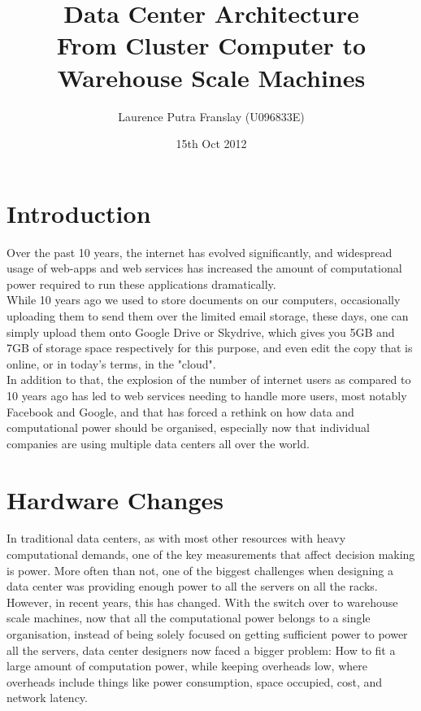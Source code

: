 \documentclass[]{article}
\begin{document}
\title{Data Center Architecture\\From Cluster Computer to Warehouse Scale Machines}
\author{Laurence Putra Franslay (U096833E)}
\date{15th Oct 2012}
\maketitle

\section{Introduction}
Over the past 10 years, the internet has evolved significantly, and widespread usage of web-apps and web services has increased the amount of computational power required to run these applications dramatically. \\

While 10 years ago we used to store documents on our computers, occasionally uploading them to send them over the limited email storage, these days, one can simply upload them onto Google Drive or Skydrive, which gives you 5GB and 7GB of storage space respectively for this purpose, and even edit the copy that is online, or in today's terms, in the "cloud". \\

In addition to that, the explosion of the number of internet users as compared to 10 years ago has led to web services needing to handle more users, most notably Facebook and Google, and that has forced a rethink on how data and computational power should be organised, especially now that individual companies are using multiple data centers all over the world. \\

\section{Hardware Changes}
In traditional data centers, as with most other resources with heavy computational demands, one of the key measurements that affect decision making is power. More often than not, one of the biggest challenges when designing a data center was providing enough power to all the servers on all the racks. \\

However, in recent years, this has changed. With the switch over to warehouse scale machines, now that all the computational power belongs to a single organisation, instead of being solely focused on getting sufficient power to power all the servers, data center designers now faced a bigger problem: How to fit a large amount of computation power, while keeping overheads low, where overheads include things like power consumption, space occupied, cost, and network latency. \\
\end{document}
